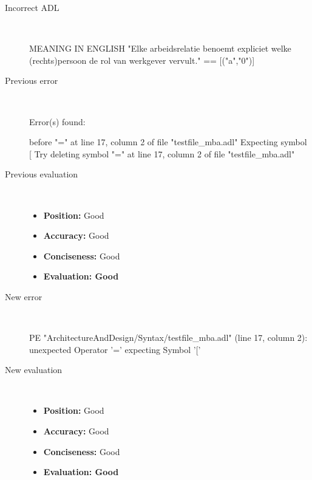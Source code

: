 \begin{description}
  \item[Incorrect ADL]~\\
\begin{adl}
MEANING IN ENGLISH "Elke arbeidsrelatie benoemt expliciet welke (rechts)persoon de rol van werkgever vervult."
== [("a","0")]        \end{adl}
  \item[Previous error]~\\
\begin{haskell}
Error(s) found:

before "=" at line 17, column 2 of file "testfile_mba.adl"
Expecting symbol [
Try deleting symbol "=" at line 17, column 2 of file "testfile_mba.adl"
\end{haskell}
  \item[Previous evaluation]~\\
    \begin{itemize}
    \item \textbf{Position:} Good
    \item \textbf{Accuracy:} Good
    \item \textbf{Conciseness:} Good
    \item \textbf{Evaluation: Good}
    \end{itemize}
  \item[New error]~\\
\begin{haskell}
PE "ArchitectureAndDesign/Syntax/testfile_mba.adl" (line 17, column 2):
unexpected Operator '='
expecting Symbol '['\end{haskell}
  \item[New evaluation]~\\
    \begin{itemize}
    \item \textbf{Position:} Good
    \item \textbf{Accuracy:} Good
    \item \textbf{Conciseness:} Good
    \item \textbf{Evaluation: Good}
    \end{itemize}
  \end{description}

\hrulefill


